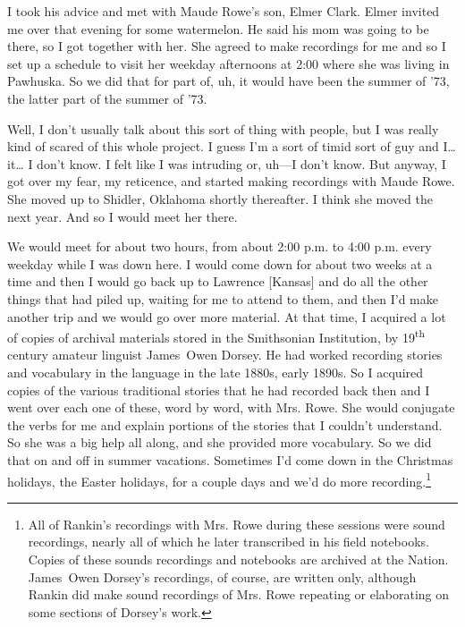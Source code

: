 \documentclass[output=paper]{LSP/langsci}
\begin{document}
I took his advice and met with Maude Rowe's son, Elmer Clark. Elmer invited me over that evening for some watermelon. He said his mom was going to be there, so I got together with her. She agreed to make recordings for me and so I set up a schedule to visit her weekday afternoons at 2:00 where she was living in Pawhuska. So we did that for part of, uh, it would have been the summer of '73, the latter part of the summer of '73. 

Well, I don't usually talk about this sort of thing with people, but I was really kind of scared of this whole project. I guess I'm a sort of timid sort of guy and I{\ldots} it{\ldots} I don't know. I felt like I was intruding or, uh---I don't know. But anyway, I got over my fear, my reticence, and started making recordings with Maude Rowe. She moved up to Shidler, Oklahoma shortly thereafter. I think she moved the next year. And so I would meet her there. 

We would meet for about two hours, from about 2:00 p.m. to 4:00 p.m. every weekday while I was down here. I would come down for about two weeks at a time and then I would go back up to Lawrence [Kansas] and do all the other things that had piled up, waiting for me to attend to them, and then I'd make another trip and we would go over more material. At that time, I acquired a lot of copies of archival materials stored in the Smithsonian Institution, by 19\textsuperscript{th} century amateur linguist James~Owen Dorsey. He had worked recording stories and vocabulary in the  language in the late 1880s, early 1890s. So I acquired copies of the various  traditional stories that he had recorded back then and I went over each one of these, word by word, with Mrs. Rowe. She would conjugate the verbs for me and explain portions of the stories that I couldn't understand. So she was a big help all along, and she provided more vocabulary. So we did that on and off in summer vacations. Sometimes I'd come down in the Christmas holidays, the Easter holidays, for a couple days and we'd do more recording.\footnote{All of Rankin's recordings with Mrs. Rowe during these sessions were sound recordings, nearly all of which he later transcribed in his field notebooks. Copies of these sounds recordings and notebooks are archived at the  Nation. James~Owen Dorsey's recordings, of course, are written only, although Rankin did make sound recordings of Mrs. Rowe repeating or elaborating on some sections of Dorsey's work.}
\end{document}

